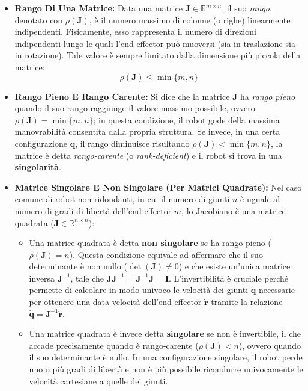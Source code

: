 \documentclass[11pt, a4paper]{report}
\begin{document}
\begin{itemize}
    \item \textbf{Rango Di Una Matrice:} Data una matrice $\bm{J} \in \mathbb{R}^{m \times n}$, il suo \textit{rango}, denotato con $\rho(\bm{J})$, è il numero massimo di colonne (o righe) linearmente indipendenti. Fisicamente, esso rappresenta il numero di direzioni indipendenti lungo le quali l'end-effector può muoversi (sia in traslazione sia in rotazione). Tale valore è sempre limitato dalla dimensione più piccola della matrice:
    \[
        \rho(\bm{J}) \leq \min\{m, n\}
    \]

    \item \textbf{Rango Pieno E Rango Carente:} Si dice che la matrice \(\bm{J}\) ha \textit{rango pieno} quando il suo rango raggiunge il valore massimo possibile, ovvero $\rho(\bm{J}) = \min\{m, n\}$; in questa condizione, il robot gode della massima manovrabilità consentita dalla propria struttura. Se invece, in una certa configurazione \(\bm{q}\), il rango diminuisce risultando $\rho(\bm{J}) < \min\{m, n\}$, la matrice è detta \textit{rango-carente} (o \textit{rank-deficient}) e il robot si trova in una \textbf{singolarità}.

    \item \textbf{Matrice Singolare E Non Singolare (Per Matrici Quadrate):} Nel caso comune di robot non ridondanti, in cui il numero di giunti \(n\) è uguale al numero di gradi di libertà dell'end-effector \(m\), lo Jacobiano è una matrice quadrata ($\bm{J} \in \mathbb{R}^{n \times n}$):
    \begin{itemize}
        \item Una matrice quadrata è detta \textbf{non singolare} se ha rango pieno ($\rho(\bm{J}) = n$). Questa condizione equivale ad affermare che il suo determinante è non nullo ($\det(\bm{J}) \neq 0$) e che esiste un'unica matrice inversa $\bm{J}^{-1}$, tale che $\bm{J}\bm{J}^{-1} = \bm{J}^{-1}\bm{J} = \bm{I}$. L'invertibilità è cruciale perché permette di calcolare in modo univoco le velocità dei giunti \(\dot{\bm{q}}\) necessarie per ottenere una data velocità dell'end-effector \(\bm{\dot{r}}\) tramite la relazione \(\dot{\bm{q}} = \bm{J}^{-1}\bm{\dot{r}}\).
        \item Una matrice quadrata è invece detta \textbf{singolare} se non è invertibile, il che accade precisamente quando è rango-carente ($\rho(\bm{J}) < n$), ovvero quando il suo determinante è nullo. In una configurazione singolare, il robot perde uno o più gradi di libertà e non è più possibile ricondurre univocamente le velocità cartesiane a quelle dei giunti.
    \end{itemize}


\end{itemize}
\end{document}
